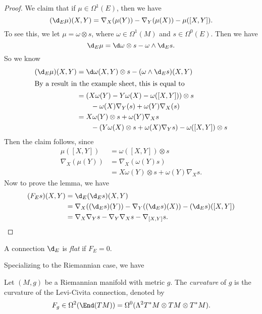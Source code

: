 \documentclass[a4paper]{article}
\begin{document}
\begin{proof}
  We claim that if $\mu \in \Omega^1(E)$, then we have
  \[
    (\d_E \mu) (X, Y) = \nabla_X (\mu(Y)) - \nabla_Y (\mu(X)) - \mu([X, Y]).
  \]
  To see this, we let $\mu = \omega \otimes s$, where $\omega \in \Omega^1(M)$ and $s \in \Omega^0(E)$. Then we have
  \[
    \d_E \mu = \d \omega \otimes s - \omega \wedge \d_E s.
  \]
  So we know
  \begin{align*}
    (\d_E \mu)(X, Y) &= \d \omega(X, Y) \otimes s - (\omega \wedge \d_E s)(X, Y)\\
    \intertext{By a result in the example sheet, this is equal to}
    &= (X \omega(Y) - Y \omega(X) - \omega([X, Y])) \otimes s \\
    &\quad\quad- \omega(X) \nabla_Y (s) + \omega(Y) \nabla_X(s)\\
    &= X \omega(Y) \otimes s + \omega(Y) \nabla_X s \\
    &\quad \quad- (Y \omega(X) \otimes s + \omega(X) \nabla_Y s) - \omega([X, Y]) \otimes s
  \end{align*}
  Then the claim follows, since
  \begin{align*}
    \mu([X, Y]) &= \omega([X, Y]) \otimes s\\
    \nabla_X(\mu(Y)) &= \nabla_X(\omega(Y) s)\\
    &= X \omega(Y) \otimes s + \omega(Y) \nabla_X s.
  \end{align*}
  Now to prove the lemma, we have
  \begin{align*}
    (F_E s)(X, Y) &= \d_E( \d_E s)(X, Y)\\
    &= \nabla_X((\d_E s)(Y)) - \nabla_Y((\d_E s)(X)) - (\d_E s)([X, Y])\\
    &= \nabla_X \nabla_Y s - \nabla_Y \nabla_X s - \nabla_{[X, Y]} s. \qedhere
  \end{align*}
\end{proof}

\begin{defi}
  A connection $\d_E$ is \emph{flat} if $F_E = 0$.
\end{defi}

Specializing to the Riemannian case, we have
\begin{defi}
  Let $(M, g)$ be a Riemannian manifold with metric $g$. The \emph{curvature} of $g$ is the curvature of the Levi-Civita connection, denoted by
  \[
    F_g \in \Omega^2(\End(TM)) = \Omega^0(\Lambda^2 T^* M \otimes TM \otimes T^*M).
  \]
\end{defi}
\end{document}

